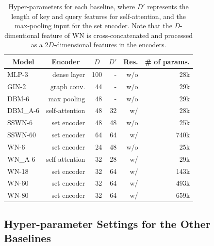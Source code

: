 \begin{table}[!ht]
    \centering
     \setlength\tabcolsep{4pt} %
    {\small
    \begin{tabular}{lrrrrr}
    \toprule
        \multicolumn{1}{c}{Model} & \multicolumn{1}{c}{Encoder} &  \multicolumn{1}{c}{$D$} & \multicolumn{1}{c}{$D'$} & Res. &\# of params. \\
        \midrule
        MLP-3  & dense layer & 100 & - & w/o & 28k  \\ %
        GIN-2 & graph conv. & 44 & - & w/o & 29k \\ %
        DBM-6 & max pooling & 48 & - & w/o & 29k  \\ %
        DBM\_A-6 & self-attention & 48 & 32 & w/ & 28k\\ %
        SSWN-6 & set encoder  & 48 & 48 & w/o & 25k \\ %
        SSWN-60 & set encoder & 64 & 64 & w/ & 740k \\ %
        WN-6 & set encoder & 24 & 48 & w/o & 25k \\ %
        WN\_A-6 & self-attention & 32 & 28 & w/ & 29k \\ %
        WN-18 & set encoder & 32 & 64 & w/ & 143k \\ %
        WN-60 & set encoder & 32 & 64 & w/ & 493k \\ %
        WN-80 & set encoder & 32 & 64 & w/ & 659k \\
        \bottomrule
    \end{tabular}
    }
    \caption{Hyper-parameters for each baseline, where $D'$ represents the length of key and query features for self-attention, and the max-pooling input for the set encoder. Note that the $D$-dimentional feature of WN is cross-concatenated and processed as a $2D$-dimensional features in the encoders. }\label{tab:hypara_baselines}
\end{table} 

\subsection{Hyper-parameter Settings for the Other Baselines}\label{ss:supp_hypara_baseline}

